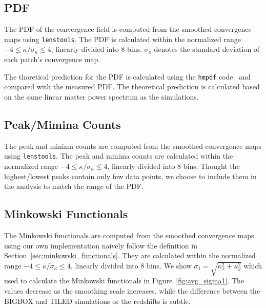 \subsection{PDF}
The PDF of the convergence field is computed from the smoothed convergence maps using \texttt{lenstools}. The PDF is calculated within the normalized range $-4 \leq \kappa/\sigma_{\kappa} \leq 4$, linearly divided into 8 bins. $\sigma_{\kappa}$ denotes the standard deviation of each patch's convergence map.

The thoretical prediction for the PDF is calculated using the \texttt{hmpdf} code~\cite{2020PhRvD.102l3545T} and compared with the measured PDF. The theoretical prediction is calculated based on the same linear matter power spectrum as the simulations.

\subsection{Peak/Mimina Counts}
The peak and minima counts are computed from the smoothed convergence maps using \texttt{lenstools}. The peak and minima counts are calculated within the normalized range $-4 \leq \kappa/\sigma_{\kappa} \leq 4$, linearly divided into 8 bins. Thought the highest/lowest peaks contain only few data points, we choose to include them in the analysis to match the range of the PDF.

\subsection{Minkowski Functionals}
The Minkowski functionals are computed from the smoothed convergence maps using our own implementation naively follow the definition in Section~\ref{sec:minkowski_functionals}. They are calculated within the normalized range $-4 \leq \kappa/\sigma_{\kappa} \leq 4$, linearly divided into 8 bins. We show $\sigma_1 = \sqrt{\kappa_{x}^2 + \kappa_{y}^2}$ which used to calculate the Minkowski functionals in Figure~\ref{fig:avg_sigma1}. The values decrease as the smoothing scale increases, while the difference between the BIGBOX and TILED simulations or the redshifts is subtle.

